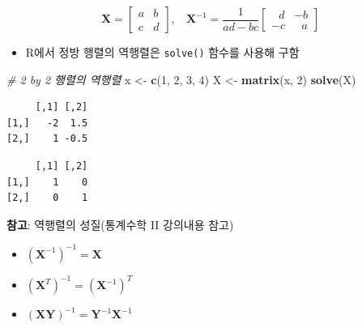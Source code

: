 \documentclass[
  11pt,
]{krantz}
\newenvironment{Shaded}{\begin{snugshade}}{\end{snugshade}}
\newcommand{\CommentTok}[1]{\textcolor[rgb]{0.37,0.37,0.37}{\textit{#1}}}
\newcommand{\DecValTok}[1]{\textcolor[rgb]{0.06,0.06,0.06}{#1}}
\newcommand{\KeywordTok}[1]{\textcolor[rgb]{0.27,0.27,0.27}{\textbf{#1}}}
\newcommand{\NormalTok}[1]{#1}
\newcommand{\OperatorTok}[1]{\textcolor[rgb]{0.43,0.43,0.43}{\textbf{#1}}}
\newcommand{\StringTok}[1]{\textcolor[rgb]{0.5,0.5,0.5}{#1}}
\providecommand{\tightlist}{%
  \setlength{\itemsep}{0pt}\setlength{\parskip}{0pt}}
\let\BeginKnitrBlock\begin \let\EndKnitrBlock\end
\begin{document}
\[\mathrm{\mathbf{X}} = 
 \begin{bmatrix}
 a & b \\
 c & d 
 \end{bmatrix}, ~~~~
 \mathrm{\mathbf{X}}^{-1} = 
 \frac{1}{ad - bc}
 \begin{bmatrix}
~~~d &  -b \\
  -c &~~~a
 \end{bmatrix}
\]

\begin{itemize}
\tightlist
\item
  R에서 정방 행렬의 역행렬은 \texttt{solve()} 함수를 사용해 구함
\end{itemize}

\footnotesize

\begin{Shaded}
\begin{Highlighting}[]
\CommentTok{# 2 by 2 행렬의 역행렬}
\NormalTok{x <-}\StringTok{ }\KeywordTok{c}\NormalTok{(}\DecValTok{1}\NormalTok{, }\DecValTok{2}\NormalTok{, }\DecValTok{3}\NormalTok{, }\DecValTok{4}\NormalTok{)}
\NormalTok{X <-}\StringTok{ }\KeywordTok{matrix}\NormalTok{(x, }\DecValTok{2}\NormalTok{)}
\KeywordTok{solve}\NormalTok{(X)}
\end{Highlighting}
\end{Shaded}

\begin{verbatim}
     [,1] [,2]
[1,]   -2  1.5
[2,]    1 -0.5
\end{verbatim}

\begin{Shaded}
\end{Shaded}

\begin{verbatim}
     [,1] [,2]
[1,]    1    0
[2,]    0    1
\end{verbatim}

\normalsize

\footnotesize

\BeginKnitrBlock{rmdtip}
\textbf{참고}: 역행렬의 성질(통계수학 II 강의내용 참고)

\begin{itemize}
\tightlist
\item
  \((\mathrm{\mathbf{X}}^{-1})^{-1} = \mathrm{\mathbf{X}}\)
\item
  \((\mathrm{\mathbf{X}}^T)^{-1} = (\mathrm{\mathbf{X}}^{-1})^T\)
\item
  \((\mathrm{\mathbf{XY}})^{-1} = \mathrm{\mathbf{Y}}^{-1}\mathrm{\mathbf{X}}^{-1}\)
\end{itemize}
\EndKnitrBlock{rmdtip}
\end{document}
